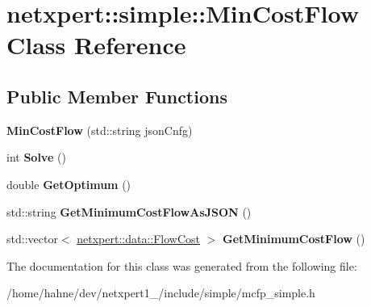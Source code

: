 \hypertarget{classnetxpert_1_1simple_1_1MinCostFlow}{}\section{netxpert\+:\+:simple\+:\+:Min\+Cost\+Flow Class Reference}
\label{classnetxpert_1_1simple_1_1MinCostFlow}
\subsection*{Public Member Functions}
\begin{DoxyCompactItemize}
\item 
{\bfseries Min\+Cost\+Flow} (std\+::string json\+Cnfg)\hypertarget{classnetxpert_1_1simple_1_1MinCostFlow_a13dfb61a02a2f888020466eb2598b40e}{}\label{classnetxpert_1_1simple_1_1MinCostFlow_a13dfb61a02a2f888020466eb2598b40e}

\item 
int {\bfseries Solve} ()\hypertarget{classnetxpert_1_1simple_1_1MinCostFlow_a9dc858a93393ef31b2c91b81a0d820f9}{}\label{classnetxpert_1_1simple_1_1MinCostFlow_a9dc858a93393ef31b2c91b81a0d820f9}

\item 
double {\bfseries Get\+Optimum} ()\hypertarget{classnetxpert_1_1simple_1_1MinCostFlow_acc572dba96f07653eb3ca0d84256b401}{}\label{classnetxpert_1_1simple_1_1MinCostFlow_acc572dba96f07653eb3ca0d84256b401}

\item 
std\+::string {\bfseries Get\+Minimum\+Cost\+Flow\+As\+J\+S\+ON} ()\hypertarget{classnetxpert_1_1simple_1_1MinCostFlow_a02be05d9010997ea763351921baef1fd}{}\label{classnetxpert_1_1simple_1_1MinCostFlow_a02be05d9010997ea763351921baef1fd}

\item 
std\+::vector$<$ \hyperlink{structnetxpert_1_1data_1_1FlowCost}{netxpert\+::data\+::\+Flow\+Cost} $>$ {\bfseries Get\+Minimum\+Cost\+Flow} ()\hypertarget{classnetxpert_1_1simple_1_1MinCostFlow_a8281df731a9a267ad58104fed3f6fa82}{}\label{classnetxpert_1_1simple_1_1MinCostFlow_a8281df731a9a267ad58104fed3f6fa82}

\end{DoxyCompactItemize}


The documentation for this class was generated from the following file\+:\begin{DoxyCompactItemize}
\item 
/home/hahne/dev/netxpert1\+\_/include/simple/mcfp\+\_\+simple.\+h\end{DoxyCompactItemize}

